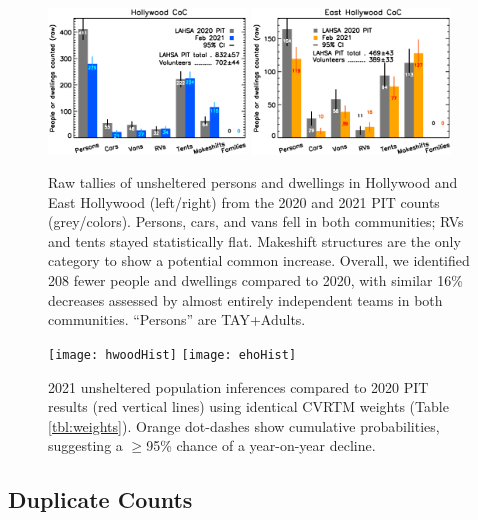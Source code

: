 \documentclass[11pt,twocolumn]{article}
\begin{document}
\begin{figure}[t]
	\centering
	\includegraphics[width = 0.47\textwidth, trim = 1cm 0cm 0cm 0cm]{Hwood2021Bars}
	\includegraphics[width = 0.47\textwidth, trim = 0cm 0cm 1cm 0cm]{Eho2021Bars}
	\caption{Raw tallies of unsheltered persons and dwellings in Hollywood and East Hollywood
			(left/right) from the 2020 and 2021 PIT counts (grey/colors). Persons, cars, 
			and vans fell in both communities; RVs and tents stayed statistically flat. 
			Makeshift structures are the only category to show a potential common increase. 
			Overall, we identified 208 fewer people and dwellings compared to 2020,
			with similar 16\% decreases assessed by almost entirely independent teams
			in both communities. ``Persons'' are TAY+Adults.}
	\label{fig:rawCounts}
\end{figure}

\begin{figure}[t]
	\centering
	\texttt{[image: hwoodHist]}
	\texttt{[image: ehoHist]}
	\caption{2021 unsheltered population inferences compared to 2020 PIT results (red vertical lines) 
			using identical CVRTM weights (Table \ref{tbl:weights}).
			Orange dot-dashes show cumulative probabilities, suggesting a $\geq$95\%
			chance of a year-on-year decline.}
	\label{fig:communityPDFs}
\end{figure}

\subsection{Duplicate Counts}
\label{sec:dupes}
\end{document}
